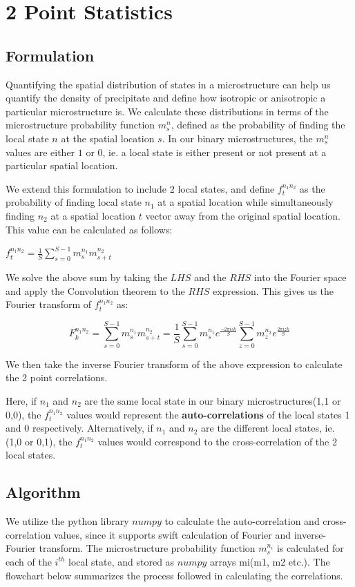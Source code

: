 \documentclass[12pt, a4paper]{report}
\begin{document}
\chapter{2 Point Statistics}
\section{Formulation}
Quantifying the spatial distribution of states in a microstructure can help us quantify the density of precipitate and define how isotropic or anisotropic a particular microstructure is. We calculate these distributions in terms of the microstructure probability function $m_s^n$, defined as the probability of finding the local state $n$ at the spatial location $s$. In our binary microstructures, the $m_s^n$ values are either $1$ or $0$, ie. a local state is either present or not present at a particular spatial location. 

We extend this formulation to include 2 local states, and define $f_t^{n_1n_2}$ as the probability of finding local state $n_1$ at a spatial location while simultaneously finding $n_2$ at a spatial location $t$ vector away from the original spatial location. This value can be calculated as follows:

$f_t^{n_1n_2} = \frac{1}{S}\sum_{s=0}^{S-1} {m_s^{n_1}}{m_{s+t}^{n_2}}$

We solve the above sum by taking the $LHS$ and the $RHS$ into the Fourier space and apply the Convolution theorem to the $RHS$ expression. This gives us the Fourier transform of $f_t^{n_1n_2}$ as:


$$
F_k^{n_1n_2} = \sum_{s=0}^{S-1}{m_s^{n_1}}{m_{s+t}^{n_2}} = \frac{1}{S} \sum_{s=0}^{S-1}{m_s^{n_1}}{e^{\frac{-2{\pi}isk}{S}}}  \sum_{z=0}^{S-1}{m_z^{n_2}}{e^{\frac{2{\pi}izk}{S}}}
$$

We then take the inverse Fourier transform of the above expression to calculate the 2 point correlations. 

Here, if $n_1$ and $n_2$ are the same local state in our binary microstructures({1,1} or {0,0}), the $f_t^{n_1n_2}$ values would represent the \textbf{auto-correlations} of the local states 1 and 0 respectively. Alternatively, if $n_1$ and $n_2$ are the different local states, ie. ({1,0} or {0,1}), the $f_t^{n_1n_2}$ values would correspond to the cross-correlation of the 2 local states.

\section{Algorithm}
We utilize the python library $numpy$ to calculate the auto-correlation and cross-correlation values, since it supports swift calculation of Fourier and inverse-Fourier transform. The microstructure probability function $m_s^{n_i}$ is calculated for each of the $i^{th}$ local state, and stored as $numpy$ arrays mi(m1, m2 etc.). The flowchart below summarizes the process followed in calculating the correlations.
\end{document}
